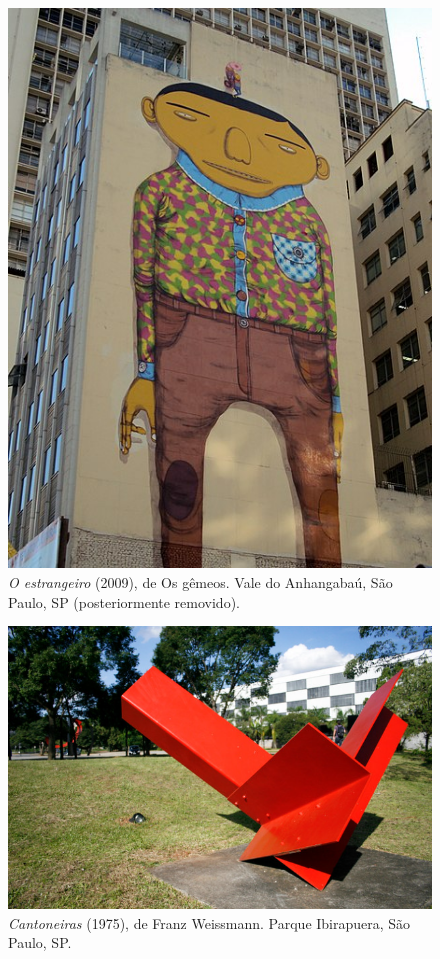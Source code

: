 \begin{figure}[htpb!]
\includegraphics[width=.5\textwidth]{./imgs/art4a.jpg}
\caption{\emph{O estrangeiro} (2009), de Os gêmeos. Vale do Anhangabaú, São Paulo, SP (posteriormente removido).}
\end{figure}
\begin{figure}[htpb!]
\includegraphics[width=.5\textwidth]{./imgs/art4b.png}
\caption{\emph{Cantoneiras} (1975), de Franz Weissmann. Parque Ibirapuera, São Paulo, SP.}
\end{figure}

